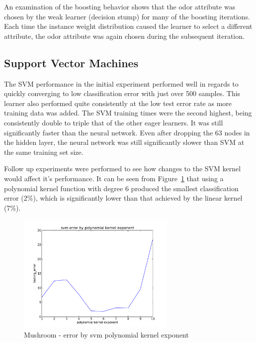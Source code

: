 \documentclass{sig-alternate}
\begin{document}
An examination of the boosting behavior shows that the odor attribute was chosen by the weak learner (decision stump) for many of the boosting iterations. Each time the instance weight distribution caused the learner to select a different attribute, the odor attribute was again chosen during the subsequent iteration.


\subsection{Support Vector Machines}

The SVM performance in the initial experiment performed well in regards to quickly converging to low classification error with just over 500 samples. This learner also performed quite consistently at the low test error rate as more training data was added. The SVM training times were the second highest, being consistently double to triple that of the other eager learners. It was still significantly faster than the neural network. Even after dropping the 63 nodes in the hidden layer, the neural network was still significantly slower than SVM at the same training set size.

Follow up experiments were performed to see how changes to the SVM kernel would affect it's performance. It can be seen from Figure~\ref{ag-svm-poly} that using a polynomial kernel function with degree 6 produced the smallest classification error (2\%), which is significantly lower than that achieved by the linear kernel (7\%).

\begin{figure}[!htbp]
    \centering
    \includegraphics[width=3in]{data/agaricus-lepiota/svm/polynomial.pdf}
    \caption{Mushroom - error by svm polynomial kernel exponent \label{ag-svm-poly}}
\end{figure} 
\end{document}
